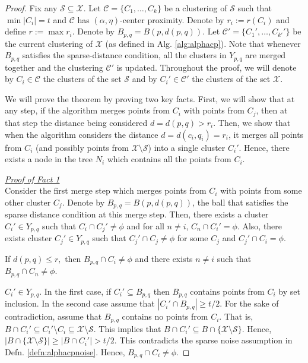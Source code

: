 \documentclass[11pt]{article}
\newcommand{\mc}{\mathcal}
\begin{document}
\begin{proof}
Fix any $\mc S \subseteq \mc X$. Let $\mc C = \{C_1, \ldots, C_k\}$ be a clustering of $\mc S$ such that $\min |C_i| = t$ and $\mc C$ has $(\alpha, \eta)$-center proximity. Denote by $r_i := r(C_i)$ and define $r := \max r_i$. Denote by $B_{p, q} = B(p, d(p, q))$. Let $\mc C' = \{C_1', \ldots, C_{k'}'\}$ be the current clustering of $\mc X$ (as defined in Alg. \ref{alg:alphacp}). Note that whenever $B_{p, q}$ satisfies the sparse-distance condition, all the clusters in $Y_{p, q}$ are merged together and the clustering $\mc C'$ is updated. Throughout the proof, we will denote by $C_i \in \mc C$ the clusters of the set $\mc S$ and by $C_i' \in \mc C'$ the clusters of the set $\mc X$.

We will prove the theorem by proving two key facts. First, we will show that at any step, if the algorithm merges points from $C_i$ with points from $C_j$, then at that step the distance being considered $d = d(p,q) > r_i$. Then, we show that when the algorithm considers the distance $d = d(c_i, q_i) = r_i$, it merges all points from $C_i$ (and possibly points from $\mc X\setminus \mc S$) into a single cluster $C_i'$. Hence, there exists a node in the tree $N_i$ which contains all the points from $C_i$. 

\noindent\textit{\underline{Proof of Fact 1}}\\
Consider the first merge step which merges points from $C_i$ with points from some other cluster $C_j$. Denote by $B_{p,q} = B(p, d(p, q))$, the ball that satisfies the sparse distance condition at this merge step. Then, there exists a cluster $C_i' \in Y_{p,q}$ such that $C_i \cap C_j' \neq \phi$ and for all $n \neq i$, $C_n \cap C_i' = \phi$. Also, there exists cluster $C_j' \in Y_{p, q}$ such that $C_j' \cap C_j \neq \phi$ for some $C_j$ and $C_j' \cap C_i = \phi$.

\begin{claim}
\label{claim:fromBothCluster}
If $d(p, q) \le r,$ then $B_{p, q} \cap C_i \neq \phi$ and there exists $n \neq i$ such that $B_{p, q} \cap C_n \neq \phi$.
\end{claim}
\vspace{-0.1in} $C_i' \in Y_{p, q}$. In the first case, if $C_i' \subseteq B_{p, q}$ then $B_{p,q}$ contains points from $C_i$ by set inclusion. In the second case assume that $|C_i' \cap B_{p,q}| \ge t/2$. For the sake of contradiction, assume that $B_{p, q}$ contains no points from $C_i$. That is, $B \cap C_i' \subseteq C_i' \setminus C_i \subseteq \mc X \setminus \mc S$. This implies that $B \cap C_i' \subseteq B \cap \{\mc X \setminus \mc S\}$. Hence, $|B\cap \{\mc X \setminus \mc S\}| \ge |B \cap C_i'| > t/2$. This contradicts the sparse noise assumption in Defn. \ref{defn:alphacpnoise}. Hence, $B_{p, q} \cap C_i \neq \phi$.


\end{proof}
\end{document}
